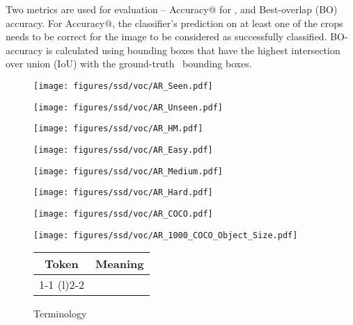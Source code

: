 \documentclass[10pt,twocolumn,letterpaper]{article}
\begin{document}
Two metrics are used for evaluation -- Accuracy@ for , and Best-overlap (BO) accuracy. For Accuracy@, the classifier's prediction on at least one of the  crops needs to be correct for the image to be considered as successfully classified. BO-accuracy is calculated using bounding boxes that have the highest intersection over union (IoU) with the ground-truth~\cite{bib:objectnet_reanalysis} bounding boxes.


{
\def \fs {0.33} \def \sfs {1} \begin{figure*}
\centering
\begin{subfigure}{\fs\textwidth}
\centering
\texttt{[image: figures/ssd/voc/AR\_Seen.pdf]}
\end{subfigure}
\begin{subfigure}{\fs\textwidth}
\centering
\texttt{[image: figures/ssd/voc/AR\_Unseen.pdf]}
\end{subfigure}
\begin{subfigure}{\fs\textwidth}
\centering
\texttt{[image: figures/ssd/voc/AR\_HM.pdf]}
\end{subfigure}
\begin{subfigure}{\fs\textwidth}
\centering
\texttt{[image: figures/ssd/voc/AR\_Easy.pdf]}
\end{subfigure}
\begin{subfigure}{\fs\textwidth}
\centering
\texttt{[image: figures/ssd/voc/AR\_Medium.pdf]}
\end{subfigure}
\begin{subfigure}{\fs\textwidth}
\centering
\texttt{[image: figures/ssd/voc/AR\_Hard.pdf]}
\end{subfigure}
\begin{subfigure}{\fs\textwidth}
\centering
\texttt{[image: figures/ssd/voc/AR\_COCO.pdf]}
\end{subfigure}
\begin{subfigure}{\fs\textwidth}
\centering
\texttt{[image: figures/ssd/voc/AR\_1000\_COCO\_Object\_Size.pdf]}
\end{subfigure}
\begin{subfigure}{\fs\textwidth}
\scriptsize
\centering
\vspace{-20pt}
\caption*{Terminology}
\setlength{\tabcolsep}{0.7em}
\begin{tabular}{c c}
\toprule
    \textbf{Token} & \textbf{Meaning} \\
    \cmidrule(r){1-1} \cmidrule(l){2-2}

\end{tabular}
\end{subfigure}
\end{figure*}}
\end{document}
